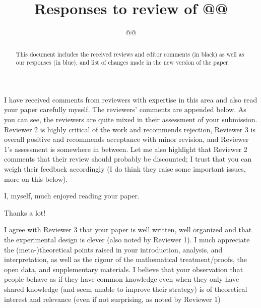 \documentclass{article}
\title{Responses to review of @@}
\author{@@}
\newenvironment{response}{\smallskip \noindent \color{blue}}{\color{black}\smallskip}
\begin{document}
\maketitle
\begin{abstract}
\begin{response}This document includes the received reviews and editor comments  (in black) as well as our responses (in blue), and list of changes made in the new version of the paper.\end{response}
\end{abstract}


I have received comments from reviewers with expertise in this area and also read your paper carefully myself. The reviewers’ comments are appended below. As you can see, the reviewers are quite mixed in their assessment of your submission. Reviewer 2 is highly critical of the work and recommends rejection, Reviewer 3 is overall positive and recommends acceptance with minor revision, and Reviewer 1’s assessment is somewhere in between. Let me also highlight that Reviewer 2 comments that their review should probably be discounted; I trust that you can weigh their feedback accordingly (I do think they raise some important issues, more on this below).


I, myself, much enjoyed reading your paper.

\begin{response}
Thanks a lot!
\end{response}

I agree with Reviewer 3 that your paper is well written, well organized and that the experimental design is clever (also noted by Reviewer 1). I much appreciate the (meta-)theoretical points raised in your introduction, analysis, and interpretation, as well as the rigour of the mathematical treatment/proofs, the open data, and supplementary materials. I believe that your observation that people behave as if they have common knowledge even when they only have shared knowledge (and seem unable to improve their strategy) is of theoretical interest and relevance (even if not surprising, as noted by Reviewer 1)
\end{document}
